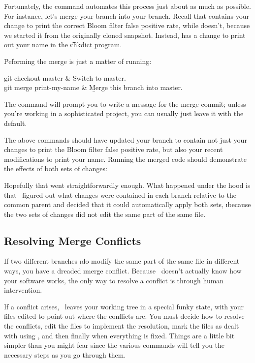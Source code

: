 \documentclass[letterpaper, 12pt, titlepage, twoside]{article}
\begin{document}
Fortunately, the  command automates this process just about as much
as possible. For instance, let's merge your  branch into your
 branch. Recall that  contains your change to print the
correct Bloom filter false positive rate, while  doesn't,
because we started it from the originally cloned snapshot. Instead,
 has a change to print out your name in the \t{chkdict}
program.

Peforming the merge is just a matter of running:

\begin{typeme}
git checkout master & Switch to master. \\
git merge print-my-name & \b{Merge this branch into master.} \\
\end{typeme}

The  command will prompt you to write a message for the merge
commit; unless you're working in a sophisticated project, you can usually just
leave it with the default.

The above commands should have updated your  branch to contain not
just your changes to print the Bloom filter false positive rate, but also your
recent modifications to print your name. Running the merged code should
demonstrate the effects of both sets of changes:


Hopefully that went straightforwardly enough. What happened under the hood is
that \git\ figured out what changes were contained in each branch relative to
the common parent and decided that it could automatically apply both sets,
\i{because the two sets of changes did not edit the same part of the same
  file}.

\subsection*{Resolving Merge Conflicts}

If two different branches \i{do} modify the same part of the same file in
different ways, you have a dreaded \i{merge conflict}. Because \git\ doesn't
actually know how your software works, the only way to resolve a conflict is
through human intervention.

If a conflict arises, \git\ leaves your working tree in a special funky state,
with your files edited to point out where the conflicts are. You must decide
how to resolve the conflicts, edit the files to implement the resolution, mark
the files as dealt with using , and then finally  when
everything is fixed. Things are a little bit simpler than you might fear since
the various commands will tell you the necessary steps as you go through them.
\end{document}
